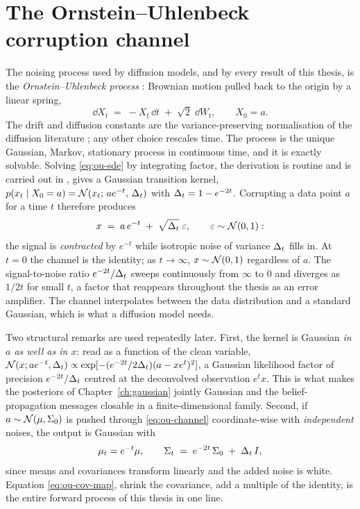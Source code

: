 \section{The Ornstein--Uhlenbeck corruption channel}\label{sec:ou}

The noising process used by diffusion models, and by every result of this
thesis, is the \emph{Ornstein--Uhlenbeck process}
\citep{uhlenbeck1930theory}: Brownian motion pulled back to the origin by a
linear spring,
\begin{equation}
  \dd X_t \;=\; -X_t\,\dd t \;+\; \sqrt{2}\;\dd W_t ,
  \qquad X_0 = a .
  \label{eq:ou-sde}
\end{equation}
The drift and diffusion constants are the variance-preserving normalisation of
the diffusion literature \citep{song2021scorebased}; any other choice rescales
time. The process is the unique Gaussian, Markov, stationary process in
continuous time, and it is exactly solvable. Solving \eqref{eq:ou-sde} by
integrating factor, the derivation is routine and is carried out in
\compendium{}, gives a Gaussian transition kernel,
$p(x_t \mid X_0 = a) = \mathcal{N}(x_t;\, a e^{-t},\, \Delta_t)$ with
$\Delta_t = 1 - e^{-2t}$. Corrupting a data point $a$ for a time $t$ therefore
produces
\begin{equation}
  x \;=\; a\, e^{-t} \;+\; \sqrt{\Delta_t}\;\varepsilon,
  \qquad \varepsilon \sim \mathcal{N}(0, 1):
  \label{eq:ou-channel}
\end{equation}
the signal is \emph{contracted} by $e^{-t}$ while isotropic noise of variance
$\Delta_t$ fills in. At $t = 0$ the channel is the identity; as $t \to \infty$,
$x \sim \mathcal{N}(0,1)$ regardless of $a$. The signal-to-noise ratio
$e^{-2t}/\Delta_t$ sweeps continuously from $\infty$ to $0$ and diverges as
$1/2t$ for small $t$, a factor that reappears throughout the thesis as an error
amplifier. The channel interpolates between the data distribution and a
standard Gaussian, which is what a diffusion model needs.

Two structural remarks are used repeatedly later. First, the kernel is Gaussian
\emph{in $a$ as well as in $x$}: read as a function of the clean variable,
$\mathcal{N}(x; a e^{-t}, \Delta_t) \propto
\exp[-(e^{-2t}/2\Delta_t)(a - x e^{t})^2]$, a Gaussian likelihood factor of
precision $e^{-2t}/\Delta_t$ centred at the deconvolved observation $e^t x$.
This is what makes the posteriors of Chapter~\ref{ch:gaussian} jointly Gaussian
and the belief-propagation messages closable in a finite-dimensional family.
Second, if $a \sim \mathcal{N}(\mu, \Sigma_0)$ is pushed through \eqref{eq:ou-channel}
coordinate-wise with \emph{independent} noises, the output is Gaussian with
\begin{equation}
  \mu_t = e^{-t}\mu,
  \qquad
  \Sigma_t \;=\; e^{-2t}\, \Sigma_0 \;+\; \Delta_t\, I ,
  \label{eq:ou-cov-map}
\end{equation}
since means and covariances transform linearly and the added noise is white.
Equation \eqref{eq:ou-cov-map}, shrink the covariance, add a multiple of the
identity, is the entire forward process of this thesis in one line.


